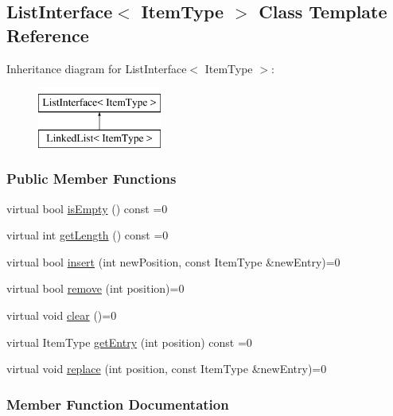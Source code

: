 \hypertarget{class_list_interface}{}\subsection{List\+Interface$<$ Item\+Type $>$ Class Template Reference}
\label{class_list_interface}
Inheritance diagram for List\+Interface$<$ Item\+Type $>$\+:\begin{figure}[H]
\begin{center}
\leavevmode
\includegraphics[height=2.000000cm]{class_list_interface}
\end{center}
\end{figure}
\subsubsection*{Public Member Functions}
\begin{DoxyCompactItemize}
\item 
virtual bool \hyperlink{class_list_interface_a924f91e7f81d7dcd3fda79bbcc671394}{is\+Empty} () const =0
\item 
virtual int \hyperlink{class_list_interface_afc85695d4137f1e29ff02e179c9f3221}{get\+Length} () const =0
\item 
virtual bool \hyperlink{class_list_interface_a5b2f86954a86172699a3495982c38e77}{insert} (int new\+Position, const Item\+Type \&new\+Entry)=0
\item 
virtual bool \hyperlink{class_list_interface_a5543002ec0d64bd2a63f3732f437af65}{remove} (int position)=0
\item 
virtual void \hyperlink{class_list_interface_adfda414908b645bdf19bcab8269168b7}{clear} ()=0
\item 
virtual Item\+Type \hyperlink{class_list_interface_a86987f69e5056d287212ede41db1956a}{get\+Entry} (int position) const =0
\item 
virtual void \hyperlink{class_list_interface_aae877a56b7b9f5f526c37a00e234fad1}{replace} (int position, const Item\+Type \&new\+Entry)=0
\end{DoxyCompactItemize}


\subsubsection{Member Function Documentation}
